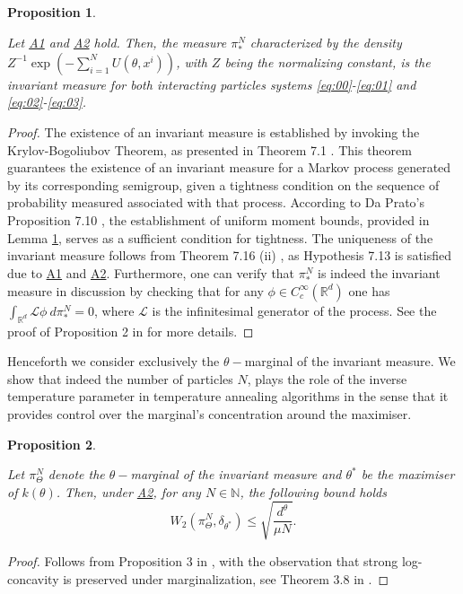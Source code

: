 \documentclass[a4paper, 10pt]{article}
\theoremstyle{plain}%
\newtheorem{proposition}{Proposition}%
\begin{document}
\begin{proposition}\hypertarget{Prop1}{} Let \hyperlink{Assum1}{A1} and \hyperlink{Assum2}{A2} hold. Then, the measure $\pi_{*}^N$ characterized by the density $Z^{-1}\exp{\left(-\sum_{i=1}^N U(\theta,x^i)\right)}$, with $Z$ being the normalizing constant, is the invariant measure for both interacting particles systems \eqref{eq:00}-\eqref{eq:01} and \eqref{eq:02}-\eqref{eq:03}.\end{proposition}
\begin{proof}
    The existence of an invariant measure is established by invoking the Krylov-Bogoliubov Theorem, as presented in Theorem 7.1 \cite{Prato}. This theorem guarantees the existence of an invariant measure for a Markov process generated by its corresponding semigroup, given a tightness condition on the sequence of probability measured associated with that process. According to Da Prato's Proposition 7.10 \cite{Prato}, the establishment of uniform moment bounds, provided in Lemma \hyperref[lemma0]{1}, serves as a sufficient condition for tightness. The uniqueness of the invariant measure follows from Theorem 7.16 (ii) \cite{Prato}, as Hypothesis 7.13 is satisfied due to \hyperlink{Assum1}{A1} and \hyperlink{Assum2}{A2}. Furthermore, one can verify that $\pi_{*}^N$ is indeed the invariant measure in discussion by checking that for any $\phi\in C^{\infty}_c(\mathbb{R}^d)$ one has $\int_{\mathbb{R}^d}\mathcal{L}\phi \ d\pi_{*}^N=0$, where $\mathcal{L}$ is the infinitesimal generator of the process. See the proof of Proposition 2 in \cite{Ipla} for more details.
\end{proof}
\noindent Henceforth we consider exclusively the $\theta-$marginal of the invariant measure. We show that indeed the number of particles $N$, plays the role of the inverse temperature parameter in temperature annealing algorithms in the sense that it provides control over the marginal's concentration around the maximiser.\\ 
\par \noindent \begin{proposition}\hypertarget{Prop2}{} Let $\pi_{\Theta}^N$ denote the $\theta-$marginal of the invariant measure and $\theta^*$ be the maximiser of $k(\theta)$. Then, under \hyperlink{Assum2}{A2}, for any $N\in\mathbb{N}$, the following bound holds
$$W_2(\pi_{\Theta}^N,\delta_{\theta^*})\leq \sqrt{\dfrac{d^{\theta}}{\mu N}}.$$\end{proposition}
\begin{proof}
    Follows from Proposition 3 in \cite{Ipla}, with the  observation that strong log-concavity is preserved under marginalization, see Theorem 3.8 in \cite{convex}.
\end{proof}
\end{document}
